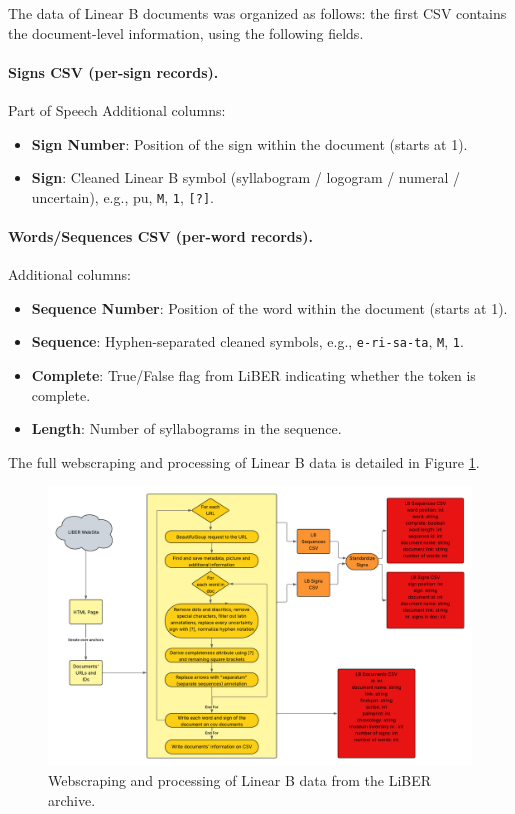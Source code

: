 The data of Linear B documents was organized as follows: the first CSV contains the document-level information, using the following fields.

\paragraph{Signs CSV (per-sign records).}Part of Speech
Additional columns:
\begin{itemize}
  \item \textbf{Sign Number}: Position of the sign within the document (starts at 1).
  \item \textbf{Sign}: Cleaned Linear B symbol (syllabogram / logogram / numeral / uncertain), e.g., pu, \texttt{M}, \texttt{1}, \texttt{[?]}.
\end{itemize}

\paragraph{Words/Sequences CSV (per-word records).}
Additional columns:
\begin{itemize}
  \item \textbf{Sequence Number}: Position of the word within the document (starts at 1).
  \item \textbf{Sequence}: Hyphen-separated cleaned symbols, e.g., \texttt{e-ri-sa-ta}, \texttt{M}, \texttt{1}.
  \item \textbf{Complete}: True/False flag from LiBER indicating whether the token is complete.
  \item \textbf{Length}: Number of syllabograms in the sequence.
\end{itemize}
The full webscraping and processing of Linear B data is detailed in Figure \ref{fig:webscrape-lb}.

\begin{figure}[H]
    \begin{adjustbox}{center}
        \includegraphics[width=1.1\textwidth]{images/webscrape_linb.png}
    \end{adjustbox}
    \caption{Webscraping and processing of Linear B data from the LiBER archive.}
    \label{fig:webscrape-lb}
\end{figure}

